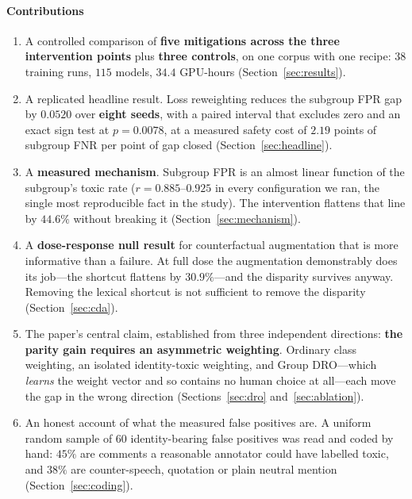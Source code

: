 \documentclass[conference]{IEEEtran}
\begin{document}
\paragraph*{Contributions}
\begin{enumerate}
\item A controlled comparison of \textbf{five mitigations across the three
      intervention points} plus \textbf{three controls}, on one corpus with one
      recipe: $38$ training runs, $115$ models, $34.4$ GPU-hours
      (Section~\ref{sec:results}).
\item A replicated headline result. Loss reweighting reduces the subgroup FPR gap
      by $0.0520$ over \textbf{eight seeds}, with a paired interval that excludes
      zero and an exact sign test at $p = 0.0078$, at a measured safety cost of
      $2.19$ points of subgroup FNR per point of gap closed
      (Section~\ref{sec:headline}).
\item A \textbf{measured mechanism}. Subgroup FPR is an almost linear function of
      the subgroup's toxic rate ($r = 0.885$--$0.925$ in every configuration we
      ran, the single most reproducible fact in the study). The intervention
      flattens that line by $44.6\%$ without breaking it
      (Section~\ref{sec:mechanism}).
\item A \textbf{dose-response null result} for counterfactual augmentation that
      is more informative than a failure. At full dose the augmentation
      demonstrably does its job---the shortcut flattens by $30.9\%$---and the
      disparity survives anyway. Removing the lexical shortcut is not sufficient
      to remove the disparity (Section~\ref{sec:cda}).
\item The paper's central claim, established from three independent directions:
      \textbf{the parity gain requires an asymmetric weighting}. Ordinary class
      weighting, an isolated identity-toxic weighting, and Group DRO---which
      \emph{learns} the weight vector and so contains no human choice at
      all---each move the gap in the wrong direction
      (Sections~\ref{sec:dro} and~\ref{sec:ablation}).
\item An honest account of what the measured false positives are. A uniform
      random sample of $60$ identity-bearing false positives was read and coded
      by hand: $45\%$ are comments a reasonable annotator could have labelled
      toxic, and $38\%$ are counter-speech, quotation or plain neutral mention
      (Section~\ref{sec:coding}).
\end{enumerate}
\end{document}
